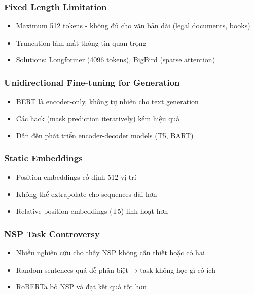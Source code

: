 \subsubsection{Fixed Length Limitation}
\begin{itemize}
    \item Maximum 512 tokens - không đủ cho văn bản dài (legal documents, books)
    \item Truncation làm mất thông tin quan trọng
    \item Solutions: Longformer (4096 tokens), BigBird (sparse attention)
\end{itemize}

\subsubsection{Unidirectional Fine-tuning for Generation}
\begin{itemize}
    \item BERT là encoder-only, không tự nhiên cho text generation
    \item Các hack (mask prediction iteratively) kém hiệu quả
    \item Dẫn đến phát triển encoder-decoder models (T5, BART)
\end{itemize}

\subsubsection{Static Embeddings}
\begin{itemize}
    \item Position embeddings cố định 512 vị trí
    \item Không thể extrapolate cho sequences dài hơn
    \item Relative position embeddings (T5) linh hoạt hơn
\end{itemize}

\subsubsection{NSP Task Controversy}
\begin{itemize}
    \item Nhiều nghiên cứu cho thấy NSP không cần thiết hoặc có hại
    \item Random sentences quá dễ phân biệt → task không học gì có ích
    \item RoBERTa bỏ NSP và đạt kết quả tốt hơn
\end{itemize}

